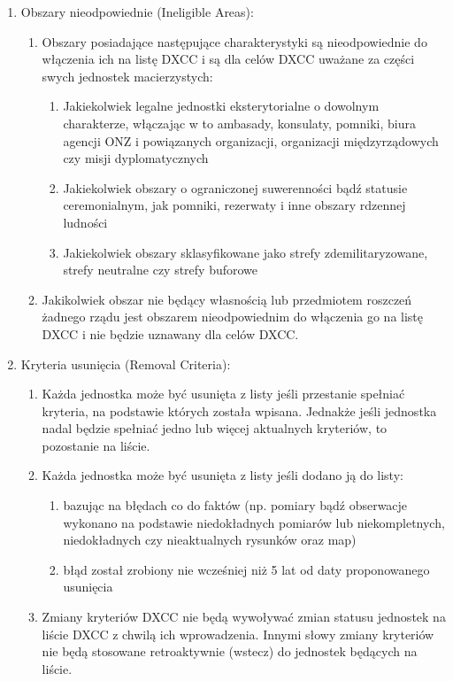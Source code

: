 \documentclass[]{mgr}
\begin{document}
\begin{enumerate}
                \item Obszary nieodpowiednie (Ineligible Areas):
                \begin{enumerate}
                    \item Obszary posiadające następujące charakterystyki są nieodpowiednie do włączenia ich na listę DXCC i są dla celów DXCC uważane za części swych jednostek macierzystych:
                    \begin{enumerate}
                        \item Jakiekolwiek legalne jednostki eksterytorialne o dowolnym charakterze, włączając w to ambasady, konsulaty, pomniki, biura agencji ONZ i powiązanych organizacji, organizacji międzyrządowych czy misji dyplomatycznych
                        \item Jakiekolwiek obszary o ograniczonej suwerenności bądź statusie ceremonialnym, jak pomniki, rezerwaty i inne obszary rdzennej ludności
                        \item Jakiekolwiek obszary sklasyfikowane jako strefy zdemilitaryzowane, strefy neutralne czy strefy buforowe
                    \end{enumerate}

                    \item Jakikolwiek obszar nie będący własnością lub przedmiotem roszczeń żadnego rządu jest obszarem nieodpowiednim do włączenia go na listę DXCC i nie będzie uznawany dla celów DXCC. 
                \end{enumerate}

                \item Kryteria usunięcia (Removal Criteria):
                \begin{enumerate}
                    \item Każda jednostka może być usunięta z listy jeśli przestanie spełniać kryteria, na podstawie których została wpisana. Jednakże jeśli jednostka nadal będzie spełniać jedno lub więcej aktualnych kryteriów, to pozostanie na liście.
                    \item Każda jednostka może być usunięta z listy jeśli dodano ją do listy:
                    \begin{enumerate}
                        \item bazując na błędach co do faktów (np. pomiary bądź obserwacje wykonano na podstawie niedokładnych pomiarów lub niekompletnych, niedokładnych czy nieaktualnych rysunków oraz map)
                        \item błąd został zrobiony nie wcześniej niż 5 lat od daty proponowanego usunięcia
                    \end{enumerate}

                    \item Zmiany kryteriów DXCC nie będą wywoływać zmian statusu jednostek na liście DXCC z chwilą ich wprowadzenia. Innymi słowy zmiany kryteriów nie będą stosowane retroaktywnie (wstecz) do jednostek będących na liście.
                \end{enumerate}
            \end{enumerate}
\end{document}
